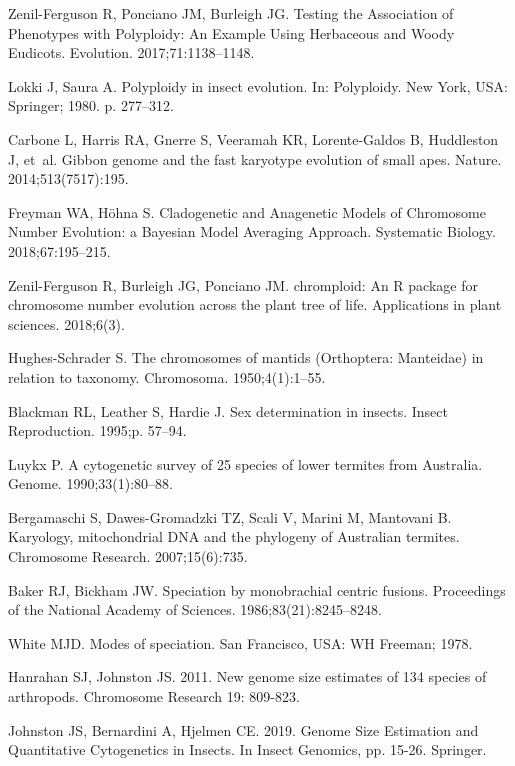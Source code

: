 \documentclass[]{rsos}%
\begin{document}
\begin{thebibliography}{9}
Zenil-Ferguson R, Ponciano JM, Burleigh JG.
 Testing the Association of Phenotypes with Polyploidy: An Example
  Using Herbaceous and Woody Eudicots.
 Evolution. 2017;71:1138--1148.

Lokki J, Saura A.
 Polyploidy in insect evolution.
 In: Polyploidy. New York, USA: Springer; 1980. p. 277--312.

Carbone L, Harris RA, Gnerre S, Veeramah KR, Lorente-Galdos B, Huddleston J,
  et~al.
 Gibbon genome and the fast karyotype evolution of small apes.
 Nature. 2014;513(7517):195.

Freyman WA, H{\"o}hna S.
 Cladogenetic and Anagenetic Models of Chromosome Number Evolution: a
  {B}ayesian Model Averaging Approach.
 Systematic Biology. 2018;67:195--215.

Zenil-Ferguson R, Burleigh JG, Ponciano JM.
 chromploid: An R package for chromosome number evolution across the
  plant tree of life.
 Applications in plant sciences. 2018;6(3).
 
Hughes-Schrader S.
 The chromosomes of mantids (Orthoptera: Manteidae) in relation to
  taxonomy.
 Chromosoma. 1950;4(1):1--55.

Blackman RL, Leather S, Hardie J.
 Sex determination in insects.
 Insect Reproduction. 1995;p. 57--94.

Luykx P.
 A cytogenetic survey of 25 species of lower termites from Australia.
Genome. 1990;33(1):80--88.

Bergamaschi S, Dawes-Gromadzki TZ, Scali V, Marini M, Mantovani B.
 Karyology, mitochondrial DNA and the phylogeny of Australian
  termites.
Chromosome Research. 2007;15(6):735.


Baker RJ, Bickham JW.
 Speciation by monobrachial centric fusions.
 Proceedings of the National Academy of Sciences.
  1986;83(21):8245--8248.

White MJD.
 Modes of speciation.
 San Francisco, USA: WH Freeman; 1978.
 

Hanrahan SJ, Johnston JS. 2011. 
New genome size estimates of 134 species of arthropods. Chromosome Research 19: 809-823.

Johnston JS, Bernardini A, Hjelmen CE. 2019. 
Genome Size Estimation and Quantitative Cytogenetics in Insects. In Insect Genomics, pp. 15-26. Springer.


\end{thebibliography}
\end{document}
